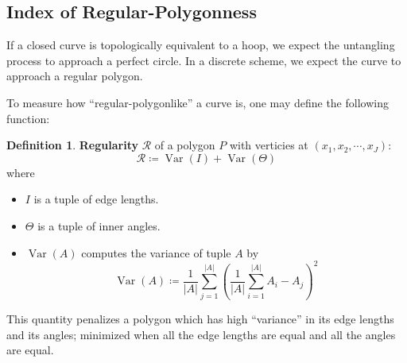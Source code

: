 \documentclass[a4paper, 11pt]{article}
\DeclareMathOperator{\Var}{Var}
\theoremstyle{definition}
\newtheorem{definition}{Definition}
\theoremstyle{remark}
\begin{document}
\subsection{Index of Regular-Polygonness}
If a closed curve is topologically equivalent to a hoop, we expect the untangling process to approach a perfect circle.
In a discrete scheme, we expect the curve to approach a regular polygon.

To measure how ``regular-polygonlike'' a curve is, one may define the following function:
\begin{definition}
    \textbf{Regularity} $\mathcal{R}$ of a polygon $P$ with verticies at $\left( x_1, x_2, \cdots, x_J \right)$:
    \begin{equation}
        \mathcal{R} \coloneqq \Var \left( I \right) + \Var \left( \Theta \right)
    \end{equation}
    where
    \begin{itemize}
        \item $I$ is a tuple of edge lengths.
        \item $\Theta$ is a tuple of inner angles.
        \item $\Var (A)$ computes the variance of tuple $A$ by
            \begin{equation}
                \Var (A) \coloneqq \frac{1}{|A|} \sum_{j = 1}^{|A|} \left( \frac{1}{|A|} \sum_{i = 1}^{|A|} A_i - A_j \right)^2
            \end{equation}
    \end{itemize}
    This quantity penalizes a polygon which has high ``variance'' in its edge lengths and its angles;
    minimized when all the edge lengths are equal and all the angles are equal.
\end{definition}
\end{document}
